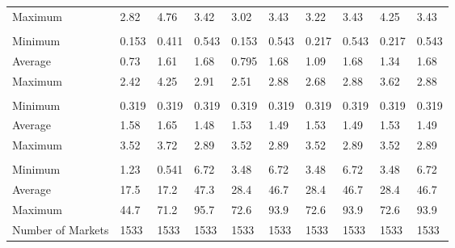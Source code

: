 \begin{tabular}[t]{llllllllll}
\hspace{1em}Maximum & 2.82 & 4.76 & 3.42 & 3.02 & 3.43 & 3.22 & 3.43 & 4.25 & 3.43\\
\addlinespace[0.3em]
\multicolumn{10}{l}{\textbf{Marginal Cost}}\\
\hspace{1em}Minimum & 0.153 & 0.411 & 0.543 & 0.153 & 0.543 & 0.217 & 0.543 & 0.217 & 0.543\\
\hspace{1em}Average & 0.73 & 1.61 & 1.68 & 0.795 & 1.68 & 1.09 & 1.68 & 1.34 & 1.68\\
\hspace{1em}Maximum & 2.42 & 4.25 & 2.91 & 2.51 & 2.88 & 2.68 & 2.88 & 3.62 & 2.88\\
\addlinespace[0.3em]
\multicolumn{10}{l}{\textbf{Miles Flown}}\\
\hspace{1em}Minimum & 0.319 & 0.319 & 0.319 & 0.319 & 0.319 & 0.319 & 0.319 & 0.319 & 0.319\\
\hspace{1em}Average & 1.58 & 1.65 & 1.48 & 1.53 & 1.49 & 1.53 & 1.49 & 1.53 & 1.49\\
\hspace{1em}Maximum & 3.52 & 3.72 & 2.89 & 3.52 & 2.89 & 3.52 & 2.89 & 3.52 & 2.89\\
\addlinespace[0.3em]
\multicolumn{10}{l}{\textbf{Origin Service Ratio}}\\
\hspace{1em}Minimum & 1.23 & 0.541 & 6.72 & 3.48 & 6.72 & 3.48 & 6.72 & 3.48 & 6.72\\
\hspace{1em}Average & 17.5 & 17.2 & 47.3 & 28.4 & 46.7 & 28.4 & 46.7 & 28.4 & 46.7\\
\hspace{1em}Maximum & 44.7 & 71.2 & 95.7 & 72.6 & 93.9 & 72.6 & 93.9 & 72.6 & 93.9\\
\midrule
Number of Markets & 1533 & 1533 & 1533 & 1533 & 1533 & 1533 & 1533 & 1533 & 1533\\
\bottomrule
\end{tabular}
